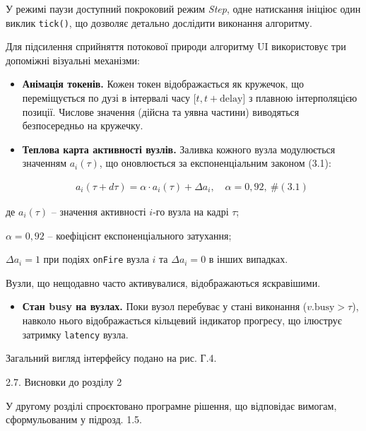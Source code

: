 \documentclass[
]{article}
\newcommand{\passthrough}[1]{#1}
\begin{document}
У режимі паузи доступний покроковий режим \emph{Step}, одне натискання
ініціює один виклик
\passthrough{\lstinline!tick!}\passthrough{\lstinline!()!}, що дозволяє
детально дослідити виконання алгоритму.

Для підсилення сприйняття потокової природи алгоритму UI використовує
три допоміжні візуальні механізми:

\begin{itemize}
\item
  \textbf{Анімація токенів.} Кожен токен відображається як кружечок, що
  переміщується по дузі в інтервалі часу
  \(\lbrack t,t + \text{delay}\rbrack\) з плавною інтерполяцією позиції.
  Числове значення (дійсна та уявна частини) виводяться безпосередньо на
  кружечку.
\item
  \textbf{Теплова карта активності вузлів.} Заливка кожного вузла
  модулюється значенням \(a_{i}(\tau)\), що оновлюється за
  експоненціальним законом (3.1):

  \[\begin{array}{r}
  a_{i}(\tau + d\tau) = \alpha \cdot a_{i}(\tau) + \Delta a_{i},\quad\alpha = 0,92,\ \#(3.1)
  \end{array}\]
\end{itemize}

де \(a_{i}(\tau)\) -- значення активності \(i\)-го вузла на кадрі
\(\tau\);

\(\alpha = 0,92\) -- коефіцієнт експоненціального затухання;

\(\Delta a_{i} = 1\) при подіях \passthrough{\lstinline!onFire!} вузла
\(i\) та \(\Delta a_{i} = 0\) в інших випадках.

Вузли, що нещодавно часто активувалися, відображаються яскравішими.

\begin{itemize}
\item
  \textbf{Стан busy на вузлах.} Поки вузол перебуває у стані виконання
  (\(v.\text{busy} > \tau\)), навколо нього відображається кільцевий
  індикатор прогресу, що ілюструє затримку
  \passthrough{\lstinline!latency!} вузла.
\end{itemize}

Загальний вигляд інтерфейсу подано на рис. Г.4.

\protect{}\label{X8bc0d69109dea8c0791268fdcf3be0892611a6e}{}2.7.
Висновки до розділу 2

У другому розділі спроєктовано програмне рішення, що відповідає вимогам,
сформульованим у підрозд. 1.5.
\end{document}
